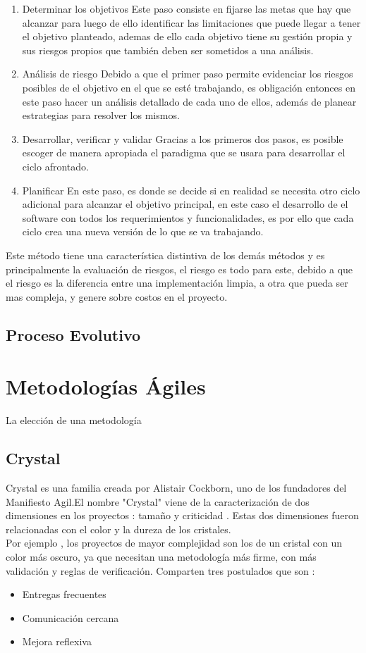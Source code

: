 \begin{enumerate}
\item Determinar los objetivos
Este paso consiste en fijarse las metas que hay que alcanzar para luego de ello identificar las limitaciones que puede llegar a tener el objetivo planteado, ademas de ello cada objetivo tiene su gestión propia y sus riesgos propios que también deben ser sometidos a una análisis.
\item Análisis de riesgo
Debido a que el primer paso permite evidenciar los riesgos posibles de el objetivo en el que se esté trabajando, es obligación entonces en este paso hacer un análisis detallado de cada uno de ellos, además de planear estrategias para resolver los mismos.
\item Desarrollar, verificar y validar
Gracias a los primeros dos pasos, es posible escoger de manera apropiada el paradigma que se usara para desarrollar el ciclo afrontado.
\item Planificar 
En este paso, es donde se decide si en realidad se necesita otro ciclo adicional para alcanzar el objetivo principal, en este caso el desarrollo de el software con todos los requerimientos y funcionalidades, es por ello que cada ciclo crea una nueva versión de lo que se va trabajando.
\end{enumerate}
Este método tiene una característica distintiva de los demás métodos y es principalmente la evaluación de riesgos, el riesgo es todo para este, debido a que el riesgo es la diferencia entre una implementación limpia, a otra que pueda ser mas compleja, y genere sobre costos en el proyecto.
\subsection{Proceso Evolutivo}
\section{Metodologías Ágiles}
La elección de una metodología
\subsection{Crystal }
Crystal es una familia creada por Alistair Cockborn, uno de los fundadores del Manifiesto Agil.El nombre "Crystal" viene de la caracterización de dos dimensiones en los proyectos : tamaño y criticidad \cite{cockburn2004crystal} . Estas dos dimensiones fueron relacionadas con el color y la dureza de los cristales. \\ Por ejemplo , los proyectos de mayor complejidad son los de un cristal con un color más oscuro, ya que necesitan una metodología más firme, con más validación y reglas de verificación.
Comparten tres postulados que son :
\begin{itemize}
	\item Entregas frecuentes
	\item Comunicación cercana
	\item Mejora reflexiva
\end{itemize}

